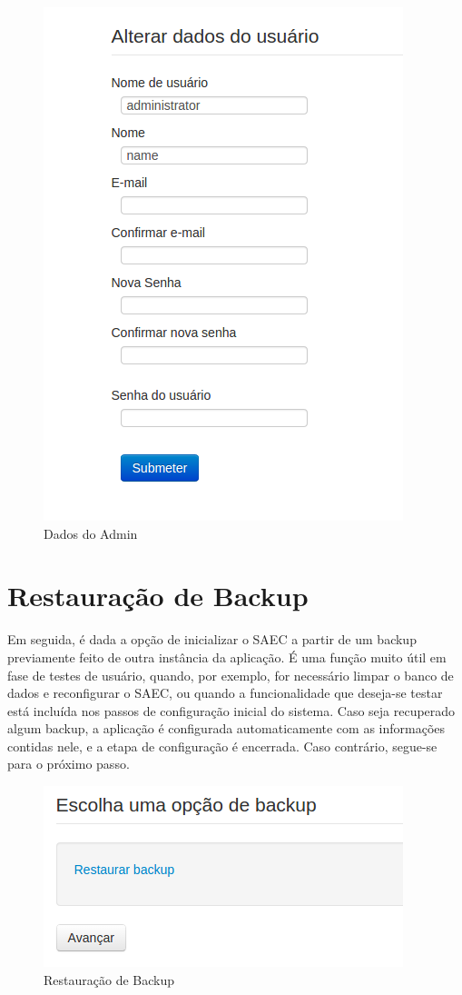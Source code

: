 \begin{figure}[h]
     \centering
     \includegraphics[scale=0.48]{images/inicioadmin.png}
     \caption{Dados do Admin}
     \label{fig:inicioadmin}
\end{figure}


\section{Restauração de Backup}
Em seguida, é dada a opção de inicializar o SAEC a partir de um backup previamente feito de outra instância da aplicação. É uma função muito útil em fase de testes de usuário, quando, por exemplo, for necessário limpar o banco de dados e reconfigurar o SAEC, ou quando a funcionalidade que deseja-se testar está incluída nos passos de configuração inicial do sistema. Caso seja recuperado algum backup, a aplicação é configurada automaticamente com as informações contidas nele, e a etapa de configuração é encerrada. Caso contrário, segue-se para o próximo passo.
    
    \begin{figure}[h]
     \centering
     \includegraphics[scale=0.6]{images/opcaobackup.png}
     \caption{Restauração de Backup}
     \label{fig:opcaobackup}
\end{figure}

